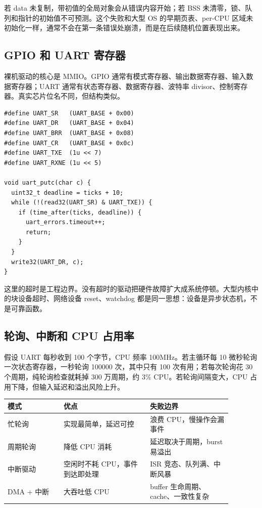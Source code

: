 若 data 未复制，带初值的全局对象会从错误内容开始；若 BSS 未清零，锁、队列和指针的初始值不可预测。这个失败和大型 OS 的早期页表、per-CPU 区域未初始化一样，通常不会在第一条错误处崩溃，而是在后续随机位置表现出来。

\subsection{GPIO 和 UART 寄存器}

裸机驱动的核心是 MMIO。GPIO 通常有模式寄存器、输出数据寄存器、输入数据寄存器；UART 通常有状态寄存器、数据寄存器、波特率 divisor、控制寄存器。真实芯片位名不同，但结构类似。

\begin{lstlisting}
#define UART_SR   (UART_BASE + 0x00)
#define UART_DR   (UART_BASE + 0x04)
#define UART_BRR  (UART_BASE + 0x08)
#define UART_CR   (UART_BASE + 0x0c)
#define UART_TXE  (1u << 7)
#define UART_RXNE (1u << 5)

void uart_putc(char c) {
  uint32_t deadline = ticks + 10;
  while (!(read32(UART_SR) & UART_TXE)) {
    if (time_after(ticks, deadline)) {
      uart_errors.timeout++;
      return;
    }
  }
  write32(UART_DR, c);
}
\end{lstlisting}

这里的超时是工程边界。没有超时的驱动把硬件故障扩大成系统停顿。大型内核中的块设备超时、网络设备 reset、watchdog 都是同一思想：设备是异步状态机，不是可靠函数。

\subsection{轮询、中断和 CPU 占用率}

假设 UART 每秒收到 100 个字节，CPU 频率 100MHz。若主循环每 10 微秒轮询一次状态寄存器，一秒轮询 100000 次，其中只有 100 次有用；若每次轮询花 30 个周期，纯轮询检查就耗掉 300 万周期，约 3\% CPU。若轮询间隔变大，CPU 占用下降，但输入延迟和溢出风险上升。

\begin{longtable}{p{0.22\linewidth}p{0.34\linewidth}p{0.32\linewidth}}
\toprule
模式 & 优点 & 失败边界 \\
\midrule
忙轮询 & 实现最简单，延迟可控 & 浪费 CPU，慢操作会漏事件 \\
周期轮询 & 降低 CPU 消耗 & 延迟取决于周期，burst 易溢出 \\
中断驱动 & 空闲时不耗 CPU，事件到达即处理 & ISR 竞态、队列满、中断风暴 \\
DMA + 中断 & 大吞吐低 CPU & buffer 生命周期、cache、一致性复杂 \\
\bottomrule
\end{longtable}

